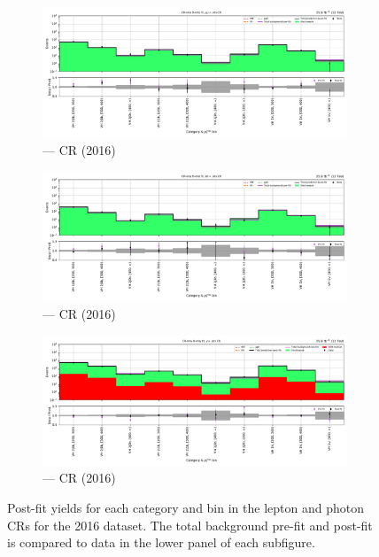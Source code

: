 \begin{figure}[htbp]
    \begin{subfigure}[b]{0.49\textwidth}
        \includegraphics[width=\textwidth]{chapters/higgstoinv/figures/mountain_ranges/2016/VH/Zmumu_tree_fit_b-abs_values_VH_cats.pdf}
        \caption{\VH --- \doubleMuCr \gls{CR} (2016)}
    \end{subfigure}
    \hfill
    \begin{subfigure}[b]{0.49\textwidth}
        \includegraphics[width=\textwidth]{chapters/higgstoinv/figures/mountain_ranges/2016/VH/Zee_tree_fit_b-abs_values_VH_cats.pdf}
        \caption{\VH --- \doubleEleCr \gls{CR} (2016)}
    \end{subfigure}

    \begin{subfigure}[b]{0.49\textwidth}
        \includegraphics[width=\textwidth]{chapters/higgstoinv/figures/mountain_ranges/2016/VH/Photon_tree_fit_b-abs_values_VH_cats.pdf}
        \caption{\VH --- \singlePhotonCr \gls{CR} (2016)}
    \end{subfigure}
    \caption[Post-fit yields for each \VH category and \ptmiss bin in the lepton and photon control regions for the 2016 dataset]{Post-fit yields for each \VH category and \ptmiss bin in the lepton and photon \glspl{CR} for the 2016 dataset. The total background pre-fit and post-fit is compared to data in the lower panel of each subfigure.}
    \label{fig:htoinv_mountain_range_VH_2016_CRs}
\end{figure}

